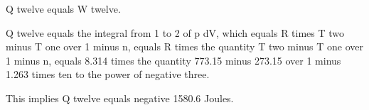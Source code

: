 Q twelve equals W twelve.

Q twelve equals the integral from 1 to 2 of p dV, which equals R times T two minus T one over 1 minus n, equals R times the quantity T two minus T one over 1 minus n, equals 8.314 times the quantity 773.15 minus 273.15 over 1 minus 1.263 times ten to the power of negative three.

This implies Q twelve equals negative 1580.6 Joules.